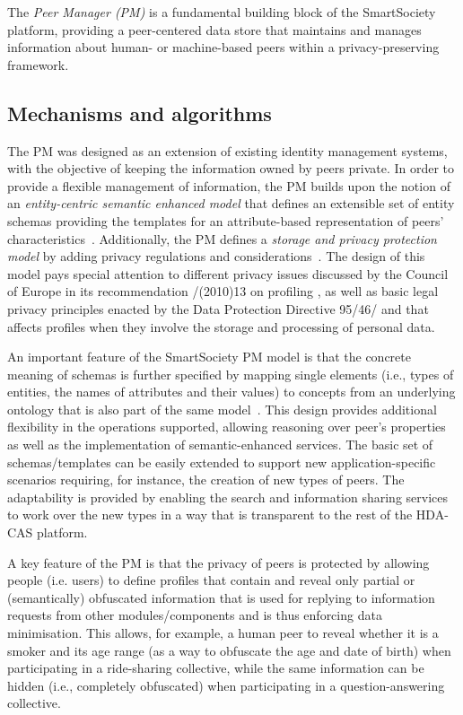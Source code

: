 The \emph{Peer Manager (PM)} is a fundamental building block of the SmartSociety platform, providing a peer-centered data store that maintains and manages information about human- or machine-based peers within a privacy-preserving framework. 

\subsection{Mechanisms and algorithms}

The PM was designed as an extension of existing identity management systems, with the objective of keeping the information owned by peers private.
In order to provide a flexible management of information, the PM builds upon the notion of an \emph{entity-centric semantic enhanced model} that defines an extensible set of entity schemas providing the templates for an attribute-based representation of peers' characteristics~\cite{Giunchiglia_fromknowledge}. Additionally, the PM defines a \emph{storage and privacy protection model} by adding privacy regulations and considerations~\cite{Hartswood:2015fe}. 
The design of this model pays special attention to different privacy issues discussed by the Council of Europe in its recommendation {}/{}(2010)13 on profiling \cite{CoE2010}, as well as 
basic legal privacy principles enacted by the {} Data Protection Directive 95/46/{} \cite{EUDir95} and that affects profiles when they involve the storage and processing of personal data.

An important feature of the SmartSociety PM model is that the concrete meaning of schemas is further specified by mapping single elements (i.e., types of entities, the names of attributes and their values) to concepts from an underlying ontology that is also part of the same model~\cite{Giunchiglia_fromknowledge}. This design provides additional flexibility in the operations supported, allowing reasoning over peer's properties as well as the implementation of semantic-enhanced services.
%
The basic set of schemas/templates can be easily extended to support new application-specific scenarios requiring, for instance, the creation of new types of peers. The adaptability is provided by enabling the search and information sharing services to work over the new types in a way that is transparent to the rest of the HDA-CAS platform.

A key feature of the PM is that the privacy of peers is protected by allowing people (i.e. users) to define profiles that contain and reveal only partial or (semantically) obfuscated information that is used for replying to information requests from other modules/components and is thus enforcing data minimisation. 
This allows, for example, a human peer to reveal whether it is a smoker and its age range (as a way to obfuscate the age and date of birth) when participating in a ride-sharing collective, while the same information can be hidden (i.e., completely obfuscated) when participating in a question-answering collective.

